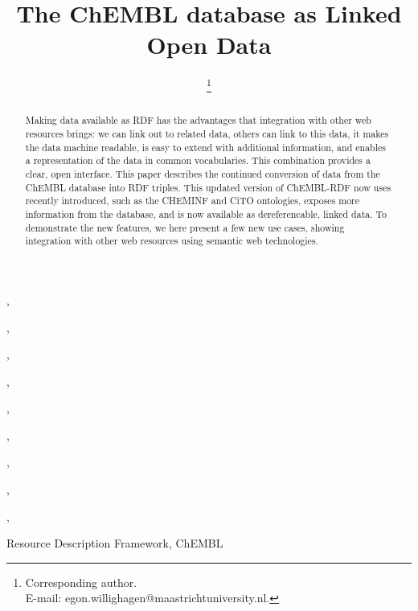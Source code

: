 \documentclass[sw]{iosart2c}
\begin{document}
\newcommand{\url}[1]{#1}

\begin{frontmatter}

\title{The ChEMBL database as Linked Open Data}



\author[A]{ \thanks{Corresponding author.\\ E-mail: egon.willighagen@maastrichtuniversity.nl.}}
\author[A]{ }
\author[B]{ },
\author[C]{ },
\author[D]{ },
\author[D]{ },
\author[E]{ },
\author[F]{ },
\author[F]{ },
\author[F]{ },
\author[G]{ },
\author[G]{ }

\address[A]{Department of Bioinformatics - BiGCaT, Maastricht University, ADDRESS, Maastricht,\\ The Netherlands}
\address[B]{Uppsala University}
\address[C]{University of Queensland}
\address[D]{Royal Society of Chemistry, 904 Tamaras Circle, Wake Forest, NC 27587, U.S.A.}
\address[E]{ChEBI, European Bioinformatics Institute}
\address[F]{ChEMBL, European Bioinformatics Institute}
\address[G]{Indiana University}

\begin{abstract}
Making data available as RDF has the advantages that integration with other web resources brings:
we can link out to related data, others can link to this data, it makes the data machine readable,
is easy to extend with additional information,  and enables a representation of the data in common
vocabularies. This combination provides a clear, open interface.
This paper describes the continued conversion of data from the ChEMBL database into RDF triples.
This updated version of ChEMBL-RDF now uses recently introduced, such as the CHEMINF and CiTO ontologies,
exposes more information from the database, and is now available as dereferencable, linked data.
To demonstrate the new features, we here present a few new use cases, showing integration with
other web resources using semantic web technologies.
\end{abstract}

\begin{keyword}
Resource Description Framework, ChEMBL
\end{keyword}

\end{frontmatter}
\end{document}
